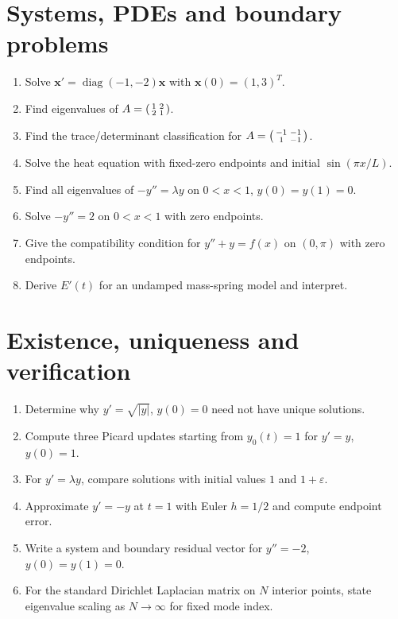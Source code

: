 \documentclass[11pt,letterpaper,oneside]{report}
\theoremstyle{definition}\newtheorem{definition}[theorem]{Definition}
\theoremstyle{remark}\newtheorem{remark}[theorem]{Remark}
\begin{document}
\section{Systems, PDEs and boundary problems}
\begin{enumerate}[label=\textbf{P\arabic*.},start=13]
\item Solve $\mathbf x'=\operatorname{diag}(-1,-2)\mathbf x$ with $\mathbf x(0)=(1,3)^T$.
\item Find eigenvalues of $A=\begin{psmallmatrix}1&2\\2&1\end{psmallmatrix}$.
\item Find the trace/determinant classification for $A=\begin{psmallmatrix}-1&-1\\1&-1\end{psmallmatrix}$.
\item Solve the heat equation with fixed-zero endpoints and initial $\sin(\pi x/L)$.
\item Find all eigenvalues of $-y''=\lambda y$ on $0<x<1$, $y(0)=y(1)=0$.
\item Solve $-y''=2$ on $0<x<1$ with zero endpoints.
\item Give the compatibility condition for $y''+y=f(x)$ on $(0,\pi)$ with zero endpoints.
\item Derive $E'(t)$ for an undamped mass-spring model and interpret.
\end{enumerate}
\section{Existence, uniqueness and verification}
\begin{enumerate}[label=\textbf{P\arabic*.},start=21]
\item Determine why $y'=\sqrt{|y|}$, $y(0)=0$ need not have unique solutions.
\item Compute three Picard updates starting from $y_0(t)=1$ for $y'=y$, $y(0)=1$.
\item For $y'=\lambda y$, compare solutions with initial values $1$ and $1+\varepsilon$.
\item Approximate $y'=-y$ at $t=1$ with Euler $h=1/2$ and compute endpoint error.
\item Write a system and boundary residual vector for $y''=-2$, $y(0)=y(1)=0$.
\item For the standard Dirichlet Laplacian matrix on $N$ interior points, state eigenvalue scaling as $N\to\infty$ for fixed mode index.
\end{enumerate}
\end{document}
